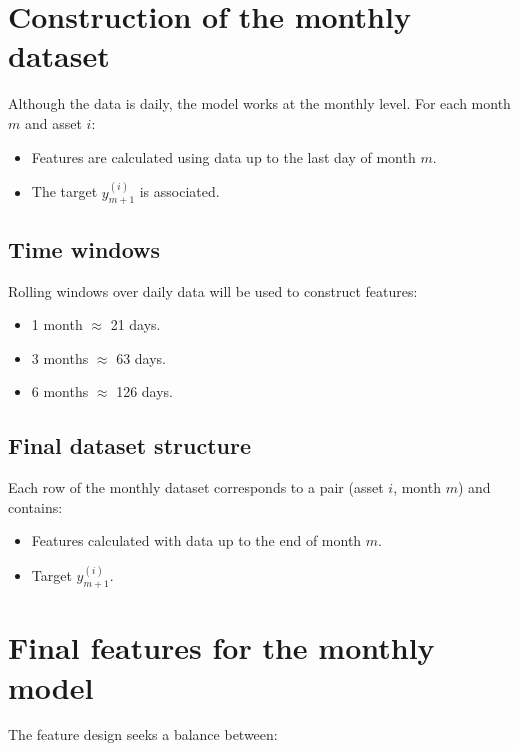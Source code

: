 \documentclass[12pt]{article}
\begin{document}
\section{Construction of the monthly dataset}

Although the data is daily, the model works at the monthly level. For each month $m$ and asset $i$:

\begin{itemize}
    \item Features are calculated using data up to the last day of month $m$.
    \item The target $y_{m+1}^{(i)}$ is associated.
\end{itemize}

\subsection{Time windows}

Rolling windows over daily data will be used to construct features:

\begin{itemize}
    \item 1 month $\approx$ 21 days.
    \item 3 months $\approx$ 63 days.
    \item 6 months $\approx$ 126 days.
\end{itemize}

\subsection{Final dataset structure}

Each row of the monthly dataset corresponds to a pair (asset $i$, month $m$) and contains:

\begin{itemize}
    \item Features calculated with data up to the end of month $m$.
    \item Target $y_{m+1}^{(i)}$.
\end{itemize}

\section{Final features for the monthly model}

The feature design seeks a balance between:
\end{document}
